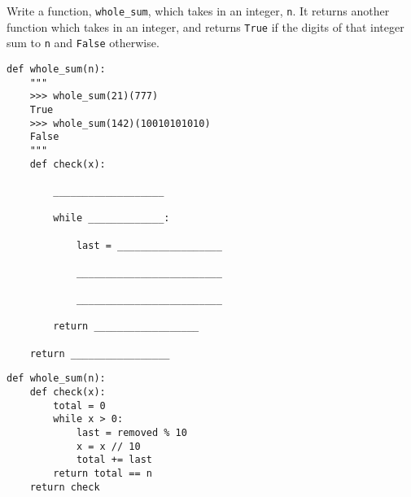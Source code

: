 \begin{blocksection}
\question Write a function, \texttt{whole\_sum}, which takes in an integer, \texttt{n}. It returns another function which takes in an integer, and returns \texttt{True} if the digits of that integer sum to \texttt{n} and \texttt{False} otherwise.

\begin{lstlisting}
def whole_sum(n): 
    """ 
    >>> whole_sum(21)(777)
    True
    >>> whole_sum(142)(10010101010)
    False
    """
    def check(x):

        ___________________
		
        while _____________:
		
            last = __________________
				
            _________________________
				
            _________________________
				
        return __________________
		
    return _________________

\end{lstlisting}

\begin{solution}
\begin{lstlisting}
def whole_sum(n):
    def check(x):
        total = 0
        while x > 0:
            last = removed % 10
            x = x // 10
            total += last
        return total == n
    return check
\end{lstlisting}
\end{solution}
\end{blocksection}
